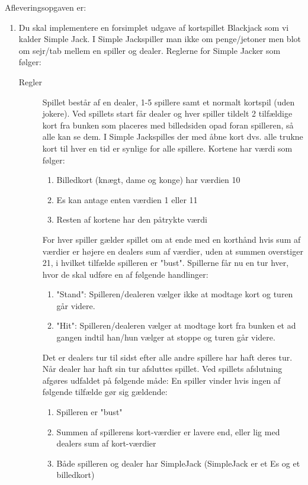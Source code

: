 \documentclass[a4paper,12pt]{article}
\newcommand{\sbl}{Simple Jack}
\begin{document}
Afleveringsopgaven er:
\begin{enumerate}[label=10g.\arabic*,start=0]
\item Du skal implementere en forsimplet udgave af kortspillet Blackjack som vi kalder \sbl. I \sbl spiller man ikke om penge/jetoner men blot om sejr/tab mellem en spiller og dealer.  Reglerne for \sbl er som følger:
  \begin{description}
  \item[Regler]
    Spillet består af en dealer, 1-5 spillere samt et normalt kortspil (uden jokere). Ved spillets start får dealer og hver spiller tildelt 2 tilfældige kort fra bunken som placeres med billedsiden opad foran spilleren, så alle kan se dem. I \sbl spilles der med åbne kort dvs. alle trukne kort til hver en tid er synlige for alle spillere.  Kortene har værdi som følger:
    \begin{enumerate}
    \item Billedkort (knægt, dame og konge) har værdien 10
    \item Es kan antage enten værdien 1 eller 11
    \item Resten af kortene har den påtrykte værdi
    \end{enumerate}
    For hver spiller gælder spillet om at ende med en korthånd hvis sum af værdier er højere en dealers sum af værdier, 
    uden at summen overstiger 21, i hvilket tilfælde spilleren er "bust".
    Spillerne får nu en tur hver, hvor de skal udføre en af følgende handlinger:
    \begin{enumerate}
    \item "Stand": Spilleren/dealeren vælger ikke at modtage kort og turen går videre.
    \item "Hit": Spilleren/dealeren vælger at modtage kort fra bunken et ad gangen indtil han/hun 
      vælger at stoppe og turen går videre.
    \end{enumerate}
    Det er dealers tur til sidst efter alle andre spillere har haft deres tur. Når dealer har haft sin tur afsluttes spillet.
    Ved spillets afslutning afgøres udfaldet på følgende måde:
    En spiller vinder hvis ingen af følgende tilfælde gør sig gældende:
    \begin{enumerate}
    \item Spilleren er "bust"
    \item Summen af spillerens kort-værdier er lavere end, eller lig med dealers sum af kort-værdier
    \item Både spilleren og dealer har SimpleJack (SimpleJack er et Es og et billedkort)

\end{enumerate}
\end{description}
\end{enumerate}
\end{document}

